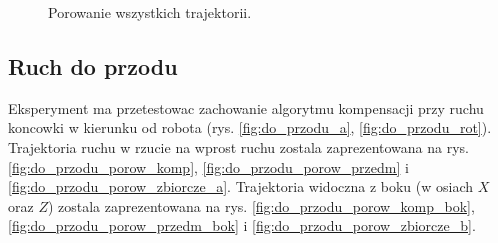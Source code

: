 

\begin{figure}[h]
	\centering
	\hfill
	\caption{Porowanie wszystkich trajektorii.}
	\label{fig:do_dolu_porow_zbiorcze}
\end{figure}

\subsection{Ruch do przodu}

Eksperyment ma przetestowac zachowanie algorytmu kompensacji przy ruchu koncowki w kierunku od robota (rys. \ref{fig:do_przodu_a}, \ref{fig:do_przodu_rot}). Trajektoria ruchu w rzucie na wprost ruchu zostala zaprezentowana na rys. \ref{fig:do_przodu_porow_komp}, \ref{fig:do_przodu_porow_przedm} i \ref{fig:do_przodu_porow_zbiorcze_a}. Trajektoria widoczna z boku (w osiach $X$ oraz $Z$) zostala zaprezentowana na rys. \ref{fig:do_przodu_porow_komp_bok}, \ref{fig:do_przodu_porow_przedm_bok} i \ref{fig:do_przodu_porow_zbiorcze_b}.

